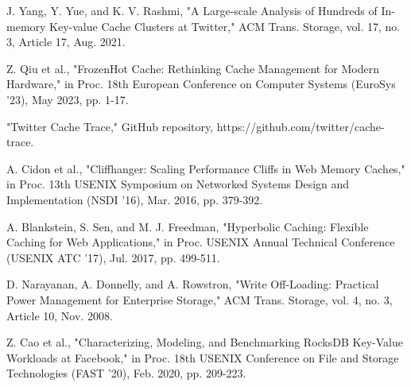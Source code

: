 \documentclass[conference]{IEEEtran}
\begin{document}
\begin{thebibliography}{00}
 J. Yang, Y. Yue, and K. V. Rashmi, "A Large-scale Analysis of Hundreds of In-memory Key-value Cache Clusters at Twitter," ACM Trans. Storage, vol. 17, no. 3, Article 17, Aug. 2021.

 Z. Qiu et al., "FrozenHot Cache: Rethinking Cache Management for Modern Hardware," in Proc. 18th European Conference on Computer Systems (EuroSys '23), May 2023, pp. 1-17.

 "Twitter Cache Trace," GitHub repository, https://github.com/twitter/cache-trace.

 A. Cidon et al., "Cliffhanger: Scaling Performance Cliffs in Web Memory Caches," in Proc. 13th USENIX Symposium on Networked Systems Design and Implementation (NSDI '16), Mar. 2016, pp. 379-392.

 A. Blankstein, S. Sen, and M. J. Freedman, "Hyperbolic Caching: Flexible Caching for Web Applications," in Proc. USENIX Annual Technical Conference (USENIX ATC '17), Jul. 2017, pp. 499-511.

 D. Narayanan, A. Donnelly, and A. Rowstron, "Write Off-Loading: Practical Power Management for Enterprise Storage," ACM Trans. Storage, vol. 4, no. 3, Article 10, Nov. 2008.

 Z. Cao et al., "Characterizing, Modeling, and Benchmarking RocksDB Key-Value Workloads at Facebook," in Proc. 18th USENIX Conference on File and Storage Technologies (FAST '20), Feb. 2020, pp. 209-223.
\end{thebibliography}
\end{document}
